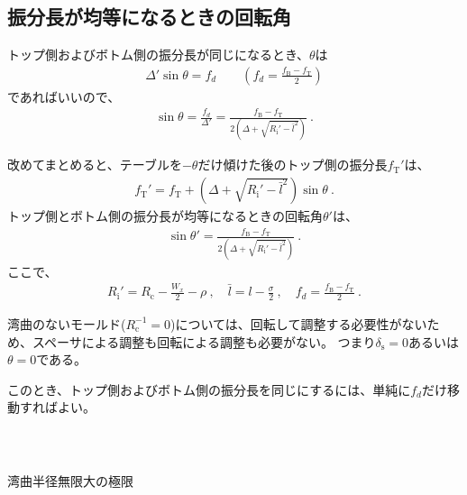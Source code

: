 \subsection{振分長が均等になるときの回転角}
トップ側およびボトム側の振分長が同じになるとき、$\theta$は
\begin{align*}
  \varDelta'\sin\theta = f_d \qquad \left(f_d = \frac{f_\mathrm B-f_\mathrm T}2\right)
\end{align*}
であればいいので、
\begin{align}
  \label{eq:saifuriwakeangle}
  \sin\theta = \frac{f_d}{\varDelta'}
  = \frac{f_\mathrm B-f_\mathrm T}{2\left(\varDelta+\sqrt{R_\mathrm i'-\bar l^2}\right)}~.
\end{align}
\begin{hosoku}
改めてまとめると、テーブルを$-\theta$だけ傾けた後のトップ側の振分長$f_\mathrm T'$は、
\begin{align*}
  f_\mathrm T' = f_\mathrm T+\left(\varDelta+\sqrt{R_\mathrm i'-\bar l^2}\right)\!\sin\theta\ .
\end{align*}
トップ側とボトム側の振分長が均等になるときの回転角$\theta'$は、
\begin{align*}
  \sin\theta' = \frac{f_\mathrm B-f_\mathrm T}{2\left(\varDelta+\sqrt{R_\mathrm i'-\bar l^2}\right)}\ .
\end{align*}
ここで、
\begin{align*}
  R_\mathrm i' = R_\mathrm c-\frac{W_x}2-\rho\ ,\quad
  \bar l = l-\frac\sigma2\ ,\quad
  f_d = \frac{f_\mathrm B-f_\mathrm T}2\ .
\end{align*}
\end{hosoku}



湾曲のないモールド($R_\mathrm c^{-1}= 0$)については、回転して調整する必要性がないため、スペーサによる調整も回転による調整も必要がない。
つまり$\delta_\mathrm s = 0$あるいは$\theta = 0$である。

このとき、トップ側およびボトム側の振分長を同じにするには、単純に$f_d$だけ移動すればよい。

~\vfill
\begin{Column}{湾曲半径無限大の極限\TBW}

\end{Column}
